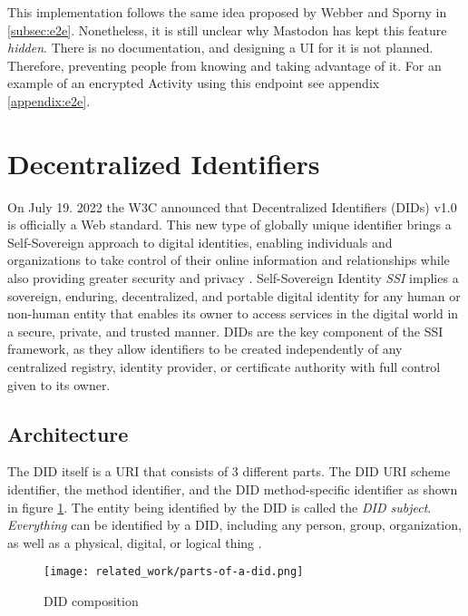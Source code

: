 This implementation follows the same idea proposed by Webber and Sporny in \ref{subsec:e2e}. Nonetheless, it is still unclear why Mastodon has kept this feature \emph{hidden}. There is no documentation, and designing a UI for it is not planned. Therefore, preventing people from knowing and taking advantage of it. For an example of an encrypted Activity using this endpoint see appendix \ref{appendix:e2e}. 

\section{Decentralized Identifiers} \label{section:dids}

On July 19. 2022 the W3C announced that Decentralized Identifiers (DIDs) v1.0 is officially a Web standard. This new type of globally unique identifier brings a Self-Sovereign approach to digital identities, enabling individuals and organizations to take control of their online information and relationships while also providing greater security and privacy \cite{w3c_2022}. Self-Sovereign Identity \emph{SSI} implies a sovereign, enduring, decentralized, and portable digital identity for any human or non-human entity that enables its owner to access services in the digital world in a secure, private, and trusted manner. DIDs are the key component of the SSI framework, as they allow identifiers to be created independently of any centralized registry, identity provider, or certificate authority with full control given to its owner\cite{Naik_Jenkins_2021}\cite{sporny_longley_sabadello_reed_steele_2021}.

\subsection{Architecture}

The DID itself is a URI that consists of 3 different parts. The DID URI scheme identifier, the method identifier, and the DID method-specific identifier as shown in figure \ref{fig:did}. The entity being identified by the DID is called the \emph{DID subject}. \emph{Everything} can be identified by a DID, including any person, group, organization, as well as a physical, digital, or logical thing \cite{Conway_Hughes_Ma_Poole_Riedel_2019}\cite{sporny_longley_sabadello_reed_steele_2021}.

\begin{figure}[h]
  \centering
  \texttt{[image: related\_work/parts-of-a-did.png]}
  \caption{DID composition \cite{sporny_longley_sabadello_reed_steele_2021}}
  \label{fig:did}
\end{figure}


